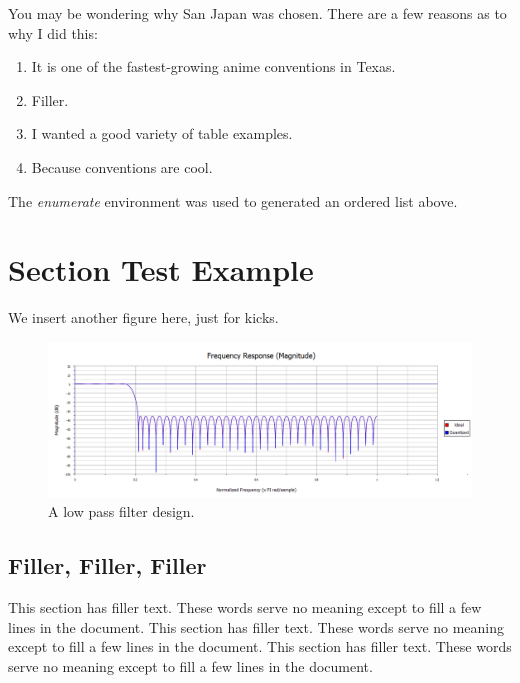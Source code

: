You may be wondering why San Japan was chosen. There are a few reasons as to why I did this:

\begin{enumerate}
	\item It is one of the fastest-growing anime conventions in Texas.
	\item Filler.
	\item I wanted a good variety of table examples.
	\item Because conventions are cool.
\end{enumerate}

The \textit{enumerate} environment was used to generated an ordered list above.

\section{Section Test Example}
We insert another figure here, just for kicks.

\begin{figure}[h!]
	\centering
	\includegraphics[width = 6.0in]{images/LowPass_Filter_Design.png}
	\caption{A low pass filter design.}
\end{figure}

\subsection{Filler, Filler, Filler}

This section has filler text. These words serve no meaning except to fill a few lines in the document. This section has filler text. These words serve no meaning except to fill a few lines in the document. This section has filler text. These words serve no meaning except to fill a few lines in the document.

